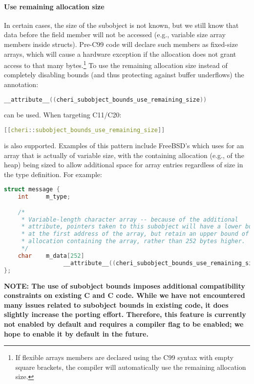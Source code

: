 \documentclass[12pt,twoside,openright,a4paper]{article}
\newcommand{\ccode}[1]{{\small\ttfamily{#1}}}
\newcommand*{\cpp}[1][]{C\textsmaller[2]{\nolinebreak[4]\hspace{-.05em}\raisebox{.45ex}{\textbf{++}}}}
\begin{document}
\paragraph{Use remaining allocation size}
In certain cases, the size of the subobject is not known, but we still know that data
before the field member will not be accessed (e.g., variable size array members
inside structs).
Pre-C99 code will declare such members as fixed-size arrays, which will cause
a hardware exception if the allocation does not grant access to that many bytes.\footnote{%
If flexible arrays members are declared using the C99 syntax with empty square
brackets, the compiler will automatically use the remaining allocation size.}
To use the remaining allocation size instead of completely disabling bounds
(and thus protecting against buffer underflows) the annotation:

\begin{lstlisting}[language={C}]
__attribute__((cheri_subobject_bounds_use_remaining_size))
\end{lstlisting}

\noindent
can be used.
When targeting \cpp{}11/C20:

\begin{lstlisting}[language={C++}]
[[cheri::subobject_bounds_use_remaining_size]]
\end{lstlisting}

\noindent
is also supported.
Examples of this pattern include FreeBSD's \ccode{struct dirent} which uses
\ccode{char d\_name[255]} for an array that is actually of variable size, with
the containing allocation (e.g., of the heap) being sized to allow additional
space for array entries regardless of size in the type definition.
For example:

\begin{lstlisting}[language={C}]
struct message {
    int     m_type;

    /*
     * Variable-length character array -- because of the additional
     * attribute, pointers taken to this subobject will have a lower bound
     * at the first address of the array, but retain an upper bound of the
     * allocation containing the array, rather than 252 bytes higher.
     */
    char    m_data[252]
                 __attribute__((cheri_subobject_bounds_use_remaining_size));
};
\end{lstlisting}

\textbf{NOTE:
The use of subobject bounds imposes additional compatibility constraints on
existing C and \cpp{} code. While we have not encountered many issues related to
subobject bounds in existing code, it does slightly increase the porting effort.
Therefore, this feature is currently not enabled by default and requires a compiler
flag to be enabled; we hope to enable it by default in the future.}
\end{document}
